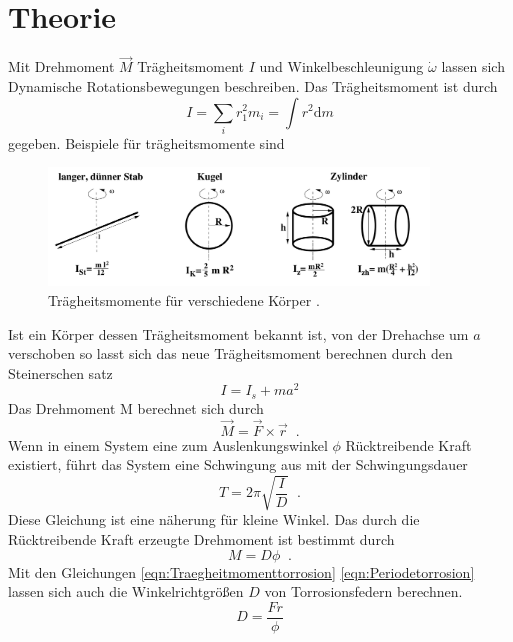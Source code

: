 

\section{Theorie}
\label{sec:Theorie}
Mit Drehmoment $\vec{M}$ Trägheitsmoment $I$ und Winkelbeschleunigung $\dot{\omega}$
lassen sich Dynamische Rotationsbewegungen beschreiben. Das Trägheitsmoment ist
durch
\begin{equation}
  I=\sum_i r_1^2m_i=\int r^2 \text{d}m
\end{equation}
gegeben.
Beispiele für trägheitsmomente sind
\begin{figure}
  \centering
  \includegraphics[width=0.9\textwidth]{Traegheitsmomente.png}
  \caption{Trägheitsmomente für verschiedene Körper \cite{sample}.}
  \label{fig:Traegheitsmomente}
\end{figure}
Ist ein Körper dessen Trägheitsmoment bekannt ist, von der Drehachse um
$a$ verschoben so lasst sich das neue Trägheitsmoment berechnen durch den
Steinerschen satz
\begin{equation}
  I=I_s+m a^2
\end{equation}
Das Drehmoment M berechnet sich durch
\begin{equation}
  \vec{M}=\vec{F}\times\vec{r}\;\;.
\end{equation}
Wenn in einem System eine zum Auslenkungswinkel $\phi$ Rücktreibende Kraft
existiert, führt das System eine Schwingung aus mit der Schwingungsdauer
\begin{equation}
  T=2\pi\sqrt{\frac{I}{D}}\;\;.
  \label{eqn:Periodetorrosion}
\end{equation}
Diese Gleichung ist eine näherung für kleine Winkel.
Das durch die Rücktreibende Kraft erzeugte Drehmoment ist bestimmt durch
\begin{equation}
  M=D \phi\;\;.
  \label{eqn:Traegheitmomenttorrosion}
\end{equation}
Mit den Gleichungen \eqref{eqn:Traegheitmomenttorrosion} \eqref{eqn:Periodetorrosion}
lassen sich auch die Winkelrichtgrößen $D$ von Torrosionsfedern
berechnen.
\begin{equation}
  D=\frac{Fr}{\phi}
  \label{eqn:Winkelrichtgroesse}
\end{equation}
  \cite{sample}
